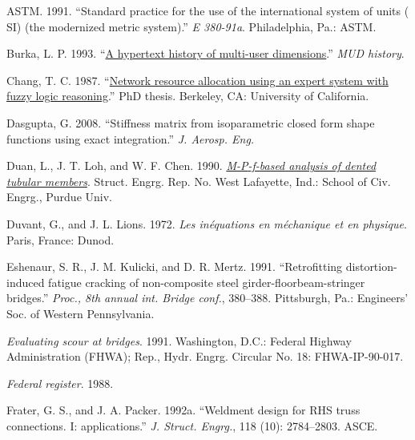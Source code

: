 \documentclass[
  NewProceedings,
  letterpaper]{./assets/ascelike-new}
\newlength{\cslhangindent}
\newlength{\cslentryspacingunit} %
\newenvironment{CSLReferences}[2] %
 {%
  \setlength{\parindent}{0pt}
  \ifodd #1
  \let\oldpar\par
  \def\par{\hangindent=\cslhangindent\oldpar}
  \fi
  \setlength{\parskip}{#2\cslentryspacingunit}
 }%
 {}
\begin{document}
\hypertarget{refs}{}
\begin{CSLReferences}{1}{0}
\leavevmode{}%
ASTM. 1991. {``Standard practice for the use of the international system
of units ({ SI}) (the modernized metric system).''} \emph{E 380-91a}.
Philadelphia, Pa.: ASTM.

\leavevmode{}%
Burka, L. P. 1993. {``\href{http://www.ccs.neu.edu}{A hypertext history
of multi-user dimensions}.''} \emph{MUD history}.

\leavevmode{}%
Chang, T. C. 1987. {``\href{}{Network resource allocation using an
expert system with fuzzy logic reasoning}.''} PhD thesis. Berkeley, CA:
University of California.

\leavevmode{}%
Dasgupta, G. 2008. {``Stiffness matrix from isoparametric closed form
shape functions using exact integration.''} \emph{J. Aerosp. Eng.}

\leavevmode{}%
Duan, L., J. T. Loh, and W. F. Chen. 1990. \emph{\href{}{M-{P}-f-based
analysis of dented tubular members}}. Struct. Engrg. Rep. No. West
Lafayette, Ind.: School of Civ. Engrg., Purdue Univ.

\leavevmode{}%
Duvant, G., and J. L. Lions. 1972. \emph{Les in{é}quations en
m{é}chanique et en physique}. Paris, France: Dunod.

\leavevmode{}%
Eshenaur, S. R., J. M. Kulicki, and D. R. Mertz. 1991. {``Retrofitting
distortion-induced fatigue cracking of non-composite steel
girder-floorbeam-stringer bridges.''} \emph{Proc., 8th annual int.
Bridge conf.}, 380--388. Pittsburgh, Pa.: Engineers' Soc. of Western
Pennsylvania.

\leavevmode{}%
\emph{Evaluating scour at bridges}. 1991. Washington, D.C.: Federal
Highway Administration (FHWA); Rep., Hydr. Engrg. Circular No. 18:
FHWA-IP-90-017.

\leavevmode{}%
\emph{Federal register}. 1988.

\leavevmode{}%
Frater, G. S., and J. A. Packer. 1992a. {``Weldment design for {RHS}
truss connections. {I}: applications.''} \emph{J. Struct. Engrg.}, 118
(10): 2784--2803. ASCE.


\end{CSLReferences}
\end{document}

